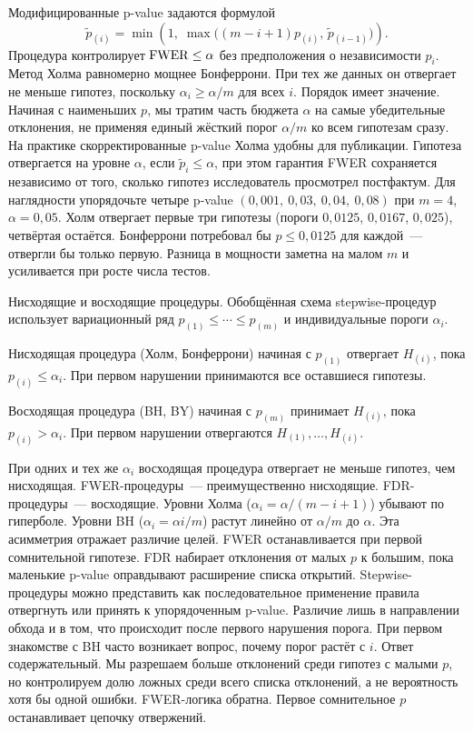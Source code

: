 Модифицированные p-value задаются формулой
\[ \tilde p_{(i)}=\min\!\left(1,\;\max\!\bigl((m-i+1)p_{(i)},\,\tilde p_{(i-1)}\bigr)\right).
\]
Процедура контролирует $\operatorname{FWER}\leq\alpha$ без предположения о независимости $p_i$.
Метод Холма равномерно мощнее Бонферрони. При тех же данных он отвергает не меньше гипотез, поскольку $\alpha_i\geq\alpha/m$ для всех $i$.
Порядок имеет значение. Начиная с наименьших $p$, мы тратим часть бюджета $\alpha$ на самые убедительные отклонения, не применяя единый жёсткий порог $\alpha/m$ ко всем гипотезам сразу.
На практике скорректированные p-value Холма удобны для публикации. Гипотеза отвергается на уровне $\alpha$, если $\tilde p_i\leq\alpha$, при этом гарантия FWER сохраняется независимо от того, сколько гипотез исследователь просмотрел постфактум.
Для наглядности упорядочьте четыре p-value $(0{,}001,\ 0{,}03,\ 0{,}04,\ 0{,}08)$ при $m=4$, $\alpha=0{,}05$. Холм отвергает первые три гипотезы (пороги $0{,}0125$, $0{,}0167$, $0{,}025$), четвёртая остаётся. Бонферрони потребовал бы $p\leq 0{,}0125$ для каждой~--- отвергли бы только первую. Разница в мощности заметна на малом $m$ и усиливается при росте числа тестов.

Нисходящие и восходящие процедуры. Обобщённая схема stepwise-процедур использует вариационный ряд $p_{(1)}\leq\cdots\leq p_{(m)}$ и индивидуальные пороги $\alpha_i$.

Нисходящая процедура (Холм, Бонферрони) начиная с $p_{(1)}$ отвергает $H_{(i)}$, пока $p_{(i)}\leq\alpha_i$. При первом нарушении принимаются все оставшиеся гипотезы.

Восходящая процедура (BH, BY) начиная с $p_{(m)}$ принимает $H_{(i)}$, пока $p_{(i)}>\alpha_i$. При первом нарушении отвергаются $H_{(1)},\ldots,H_{(i)}$.

При одних и тех же $\alpha_i$ восходящая процедура отвергает не меньше гипотез, чем нисходящая.
FWER-процедуры~--- преимущественно нисходящие. FDR-процедуры~--- восходящие.
Уровни Холма ($\alpha_i=\alpha/(m-i+1)$) убывают по гиперболе. Уровни BH ($\alpha_i=\alpha i/m$) растут линейно от $\alpha/m$ до $\alpha$.
Эта асимметрия отражает различие целей. FWER останавливается при первой сомнительной гипотезе. FDR набирает отклонения от малых $p$ к большим, пока маленькие p-value оправдывают расширение списка открытий.
Stepwise-процедуры можно представить как последовательное применение правила отвергнуть или принять к упорядоченным p-value. Различие лишь в направлении обхода и в том, что происходит после первого нарушения порога.
При первом знакомстве с BH часто возникает вопрос, почему порог растёт с $i$. Ответ содержательный. Мы разрешаем больше отклонений среди гипотез с малыми $p$, но контролируем долю ложных среди всего списка отклонений, а не вероятность хотя бы одной ошибки. FWER-логика обратна. Первое сомнительное $p$ останавливает цепочку отвержений.

